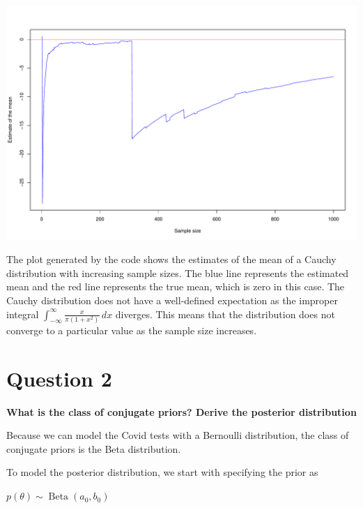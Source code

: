 \documentclass{article}
\begin{document}
\includegraphics{Figures and Plots/figure-latex/global_options3-1.pdf}
\newpage 

The plot generated by the code shows the estimates of the mean of a
Cauchy distribution with increasing sample sizes. The blue line
represents the estimated mean and the red line represents the true mean, which is zero in this case. The Cauchy
distribution does not have a well-defined expectation as the improper integral $\displaystyle \int_{-\infty}^{\infty} \frac{x}{\pi(1+x^2)} \, dx$ diverges. This means that the distribution does not converge
to a particular value as the sample size increases.

\section*{Question 2}

\vspace{2em}

\begin{center}
\textbf{What is the class of conjugate priors? Derive the posterior distribution} 
\end{center}

\vspace{2em}

Because we can model the Covid tests with a Bernoulli distribution, the class of conjugate priors is the Beta distribution. \par
To model the posterior distribution, we start with specifying the prior as \par
\begin{center}
  $p(\theta) \sim \operatorname{Beta}(a_{0}, b_{0})$   
\end{center}
\end{document}
